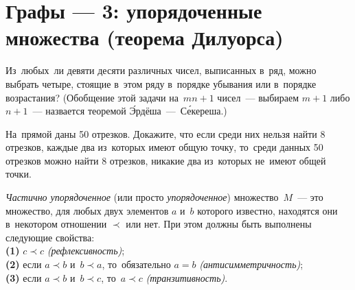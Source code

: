 

\section*{Графы --- 3: упорядоченные множества (теорема Дилуорса)}


\begin{problems}

\item
Из~любых~ли
\quad
\sp девяти
\quad
\sp десяти
\quad
различных чисел, выписанных в~ряд, можно выбрать четыре, стоящие в~этом ряду
в~порядке убывания или в~порядке возрастания?
(Обобщение этой задачи на~$m n + 1$ чисел~---
выбираем $m + 1$ либо $n + 1$~--- назвается
теоремой \'{Э}рдёша~---~С\'{е}кереша.)

\item
На~прямой даны 50 отрезков.
Докажите, что если среди них нельзя найти 8 отрезков, каждые два из~которых
имеют общую точку, то~среди данных 50 отрезков можно найти 8 отрезков, никакие
два из~которых не~имеют общей точки.

\end{problems}

\emph{Частично упорядоченное} (или просто \emph{упорядоченное})
множество~$M$~--- это множество, для любых двух элементов $a$ и~$b$ которого
известно, находятся они в~некотором отношении $\prec$ или нет.
При этом должны быть выполнены следующие свойства:
\\
\textbf{(1)}
$c \prec c$ \emph{(рефлексивность)};
\\
\textbf{(2)}
если $a \prec b$ и~$b \prec a$, то~обязательно $a = b$
\emph{(антисимметричность)};
\\
\textbf{(3)}
если $a \prec b$ и~$b \prec c$, то~$a \prec c$ \emph{(транзитивность)}.

